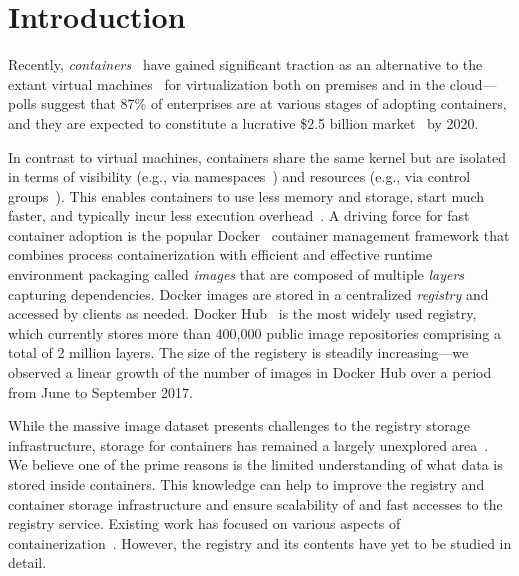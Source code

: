 \section{Introduction}



Recently, \emph{containers}~\cite{process-containers-linux} have
gained significant traction as an alternative to the extant virtual
machines~\cite{rosenblum2005virtual} for virtualization both on
premises and in the cloud---polls suggest that 87\% of enterprises are
at various stages of adopting containers, and they are expected to
constitute a lucrative \$2.5 billion
market~\cite{container-grow-by2020} by 2020.

In contrast to virtual machines, containers share the same kernel but
are isolated in terms of visibility (e.g., via
namespaces~\cite{man-namespaces}) and resources (e.g., via control
groups~\cite{kernel-doc-cgroups}).  This enables containers to use
less memory and storage, start much faster, and typically incur less
execution overhead~\cite{Disco}. A driving force for fast container
adoption is the popular Docker~\cite{docker} container management
framework that combines process containerization with efficient and
effective runtime environment packaging called {\em images} that are composed of multiple {\em layers} capturing dependencies.  
%
Docker
images are stored in a centralized \emph{registry} and accessed by clients as needed.
%
Docker Hub~\cite{docker-hub} is the most widely used registry, which currently
stores more than 400,000 public image repositories comprising a total of 2 million layers.
The size of the registery 
is steadily increasing---we observed a linear growth of the
number of images in Docker Hub over a period from June to September 2017.


While the massive image dataset presents challenges to the registry storage
infrastructure, storage for containers has remained a largely unexplored
area~\cite{login-container-storage-options}.
%
We believe one of the prime reasons is the limited understanding of what data
is stored inside containers.
%
This knowledge can help to improve the registry and container
storage infrastructure and ensure scalability of and fast accesses to the
registry service.
%
Existing work has focused on various aspects of
containerization~\cite{slacker, dockervulnerabile, dockerfinder,
analysisdockergithub, dockerssd}. However, the registry and its
contents have yet to be studied in detail.

